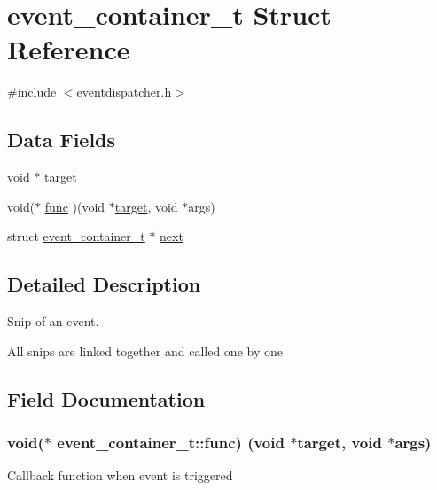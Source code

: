 \hypertarget{structevent__container__t}{}\section{event\+\_\+container\+\_\+t Struct Reference}
\label{structevent__container__t}


{\ttfamily \#include $<$eventdispatcher.\+h$>$}

\subsection*{Data Fields}
\begin{DoxyCompactItemize}
\item 
void $\ast$ \hyperlink{structevent__container__t_a30d9aecb000fe0e8b061b970ad1def64}{target}
\item 
void($\ast$ \hyperlink{structevent__container__t_aaacd0a374bd54844543a994136fdbe9f}{func} )(void $\ast$\hyperlink{structevent__container__t_a30d9aecb000fe0e8b061b970ad1def64}{target}, void $\ast$args)
\item 
struct \hyperlink{structevent__container__t}{event\+\_\+container\+\_\+t} $\ast$ \hyperlink{structevent__container__t_aa376d3f2363bf71a71c7b740cbc26dcd}{next}
\end{DoxyCompactItemize}


\subsection{Detailed Description}
Snip of an event.

All snips are linked together and called one by one 

\subsection{Field Documentation}
\subsubsection[{\texorpdfstring{func}{func}}]{\setlength{\rightskip}{0pt plus 5cm}void($\ast$ event\+\_\+container\+\_\+t\+::func) (void $\ast${\bf target}, void $\ast$args)}\hypertarget{structevent__container__t_aaacd0a374bd54844543a994136fdbe9f}{}\label{structevent__container__t_aaacd0a374bd54844543a994136fdbe9f}
Callback function when event is triggered 
